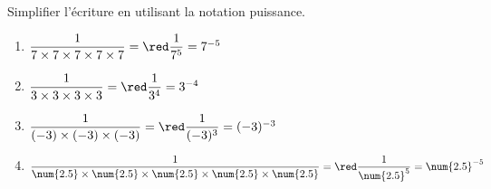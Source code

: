     Simplifier l'écriture en utilisant la notation puissance.
    \begin{spacing}{2}
        \begin{enumerate}
            \item $\dfrac{1}{7\times 7\times 7\times 7\times 7}                                         ={\red \dfrac{1}{7^5}          = 7^{-5}}$
            \item $\dfrac{1}{3\times 3\times 3\times 3}                                                 ={\red \dfrac{1}{3^4}          = 3^{-4}}$
            \item $\dfrac{1}{(-3)\times (-3)\times (-3)}                                                ={\red \dfrac{1}{(-3)^3}       = (-3)^{-3}}$
            \item $\dfrac{1}{\num{2.5}\times \num{2.5}\times \num{2.5}\times \num{2.5}\times \num{2.5}} ={\red \dfrac{1}{\num{2.5}^5}  = \num{2.5}^{-5}}$
        \end{enumerate}
    \end{spacing}
